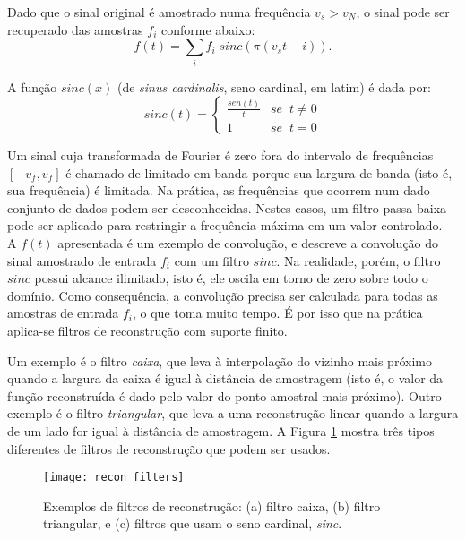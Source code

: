 Dado que o sinal original é amostrado numa frequência $v_{s} > v_{N}$, o sinal pode ser recuperado das amostras $f_{i}$ conforme abaixo:
\[
	f(t) = \sum_{i} f_{i}\;sinc(\pi (v_{s}t - i)).
\]

A função $sinc(x)$ (de {\it sinus cardinalis}, seno cardinal, em latim) é dada por:
\[
	sinc(t) = \left\{ 
	\begin{array}{cl} 
	\frac{sen(t)}{t} & se\;\; t \neq 0  \\
	1 & se\;\; t = 0
	\end{array} \right. 
\]

Um sinal cuja transformada de Fourier é zero fora do intervalo de frequências $[-v_{f}, v_{f}]$ é chamado de limitado em banda porque sua largura de banda (isto é, sua frequência) é limitada. Na prática, as frequências que ocorrem num dado conjunto de dados podem ser desconhecidas. Nestes casos, um filtro passa-baixa pode ser aplicado para restringir a frequência máxima em um valor controlado. \\

A $f(t)$ apresentada é um exemplo de convolução, e descreve a convolução do sinal amostrado de entrada $f_{i}$ com um filtro $sinc$. Na realidade, porém, o filtro $sinc$ possui alcance ilimitado, isto é, ele oscila em torno de zero sobre todo o domínio. Como consequência, a convolução precisa ser calculada para todas as amostras de entrada $f_{i}$, o que toma muito tempo. É por isso que na prática aplica-se filtros de reconstrução com suporte finito.

Um exemplo é o filtro {\it caixa}, que leva à interpolação do vizinho mais próximo quando a largura da caixa é igual à distância de amostragem (isto é, o valor da função reconstruída é dado pelo valor do ponto amostral mais próximo). Outro exemplo é o filtro {\it triangular}, que leva a uma reconstrução linear quando a largura de um lado for igual à distância de amostragem. A Figura \ref{filters} mostra três tipos diferentes de filtros de reconstrução que podem ser usados. \\

\begin{figure}[!htb]
\center
\texttt{[image: recon\_filters]}
\caption{Exemplos de filtros de reconstrução: (a) filtro caixa, (b) filtro triangular, e (c) filtros que usam o seno cardinal, {\it sinc}.}
\label{filters}
\end{figure}

